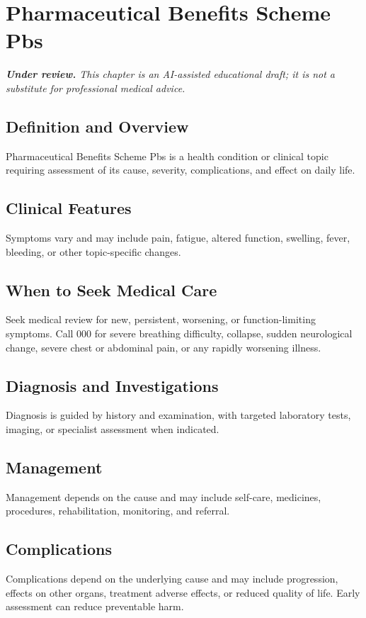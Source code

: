 \chapter{Pharmaceutical Benefits Scheme Pbs}

\medskip
\noindent\textit{\textbf{Under review.} This chapter is an AI-assisted educational draft; it is not a substitute for professional medical advice.}

\section*{Definition and Overview}
Pharmaceutical Benefits Scheme Pbs is a health condition or clinical topic requiring assessment of its cause, severity, complications, and effect on daily life.

\section*{Clinical Features}
Symptoms vary and may include pain, fatigue, altered function, swelling, fever, bleeding, or other topic-specific changes.

\section*{When to Seek Medical Care}
Seek medical review for new, persistent, worsening, or function-limiting symptoms. Call 000 for severe breathing difficulty, collapse, sudden neurological change, severe chest or abdominal pain, or any rapidly worsening illness.

\section*{Diagnosis and Investigations}
Diagnosis is guided by history and examination, with targeted laboratory tests, imaging, or specialist assessment when indicated.

\section*{Management}
Management depends on the cause and may include self-care, medicines, procedures, rehabilitation, monitoring, and referral.

\section*{Complications}
Complications depend on the underlying cause and may include progression, effects on other organs, treatment adverse effects, or reduced quality of life. Early assessment can reduce preventable harm.

